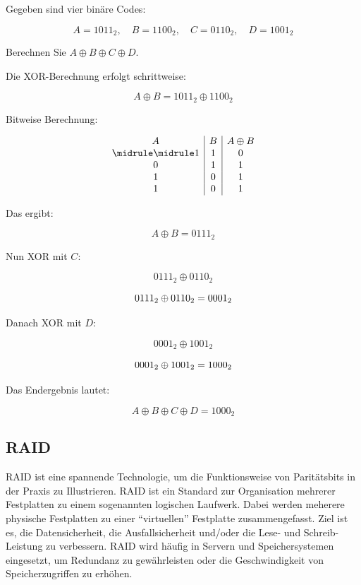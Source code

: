 \begin{myexercise}
	Gegeben sind vier binäre Codes:

	\[
		A = 1011_2, \quad B = 1100_2, \quad C = 0110_2, \quad D = 1001_2
	\]

	Berechnen Sie \( A \oplus B \oplus C \oplus D \).

	\begin{myanswer}
		Die XOR-Berechnung erfolgt schrittweise:

		\[
			A \oplus B = 1011_2 \oplus 1100_2
		\]

		Bitweise Berechnung:

		\[
			\begin{array}{c|c|c}
				A & B & A \oplus B \\\midrule\midrule
				1 & 1 & 0          \\
				0 & 1 & 1          \\
				1 & 0 & 1          \\
				1 & 0 & 1          \\
			\end{array}
		\]

		Das ergibt:

		\[
			A \oplus B = 0111_2
		\]

		Nun XOR mit \( C \):

		\[
			0111_2 \oplus 0110_2
		\]

		\[
			0111_2 \oplus 0110_2 = 0001_2 \\
		\]

		Danach XOR mit \( D \):

		\[
			0001_2 \oplus 1001_2
		\]

		\[
			0001_2 \oplus  1001_2 = 1000_2 \\
		\]

		Das Endergebnis lautet:

		\[
			A \oplus B \oplus C \oplus D = 1000_2
		\]

	\end{myanswer}
\end{myexercise}

\clearpage
\subsection{RAID}

\gls{RAID} ist eine spannende Technologie, um die Funktionsweise von Paritätsbits in der Praxis zu Illustrieren. \gls{RAID} ist ein Standard zur Organisation mehrerer Festplatten zu einem sogenannten logischen Laufwerk. Dabei werden meherere physische Festplatten zu einer \enquote{virtuellen} Festplatte zusammengefasst. Ziel ist es, die Datensicherheit, die Ausfallsicherheit und/oder die Lese- und Schreib-Leistung zu verbessern. RAID wird häufig in Servern und Speichersystemen eingesetzt, um Redundanz zu gewährleisten oder die Geschwindigkeit von Speicherzugriffen zu erhöhen.

